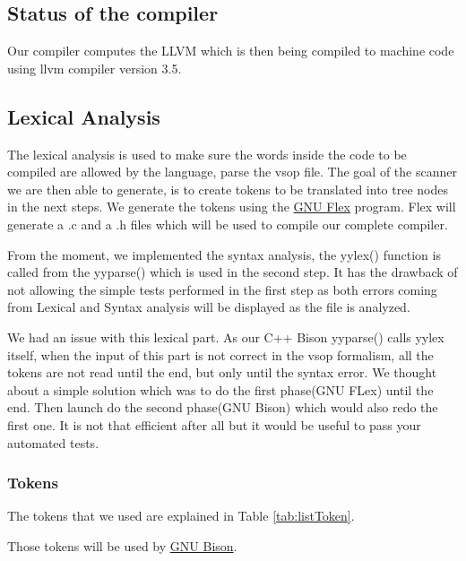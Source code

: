 \documentclass[a4paper,11pt]{article}
\begin{document}
\subsection*{Status of the compiler}

Our compiler computes the LLVM which is then being compiled to machine code using llvm compiler version 3.5.

\subsection{Lexical Analysis}
  \label{sec:lexana}
  The lexical analysis is used to make sure the words inside the code to be compiled are allowed by the language, parse the vsop file.
  The goal of the scanner we are then able to generate, is to create tokens to be translated into tree nodes in the next steps. 
  We generate the tokens using the \href{https://github.com/westes/flex}{GNU Flex} program. Flex will generate a .c and a .h files 
  which will be used to compile our complete compiler.

  From the moment, we implemented the syntax analysis, the yylex() function is called from the yyparse() which is used in the second step.
  It has the drawback of not allowing the simple tests performed in the first step as both errors coming from Lexical and Syntax analysis
  will be displayed as the file is analyzed. 

  We had an issue with this lexical part. As our C++ Bison yyparse() calls yylex itself, when the input of this part is not correct 
  in the vsop formalism, all the tokens are not read until the end, but only until the syntax error. 
  We thought about a simple solution which was to do the first phase(GNU FLex) until the end. Then launch do the second phase(GNU Bison) 
  which would also redo the first one. It is not that efficient after all but it would be useful to pass your automated tests.
  



  \subsubsection{Tokens}
    The tokens that we used are explained in Table \ref{tab:listToken}.

    Those tokens will be used by \href{http://www.gnu.org/software/bison/}{GNU Bison}.
\end{document}
